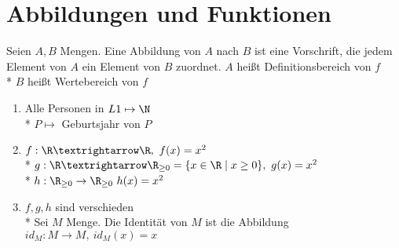 %
\chapter{Abbildungen und Funktionen}
Seien $A, B$ Mengen. Eine Abbildung von $A$ nach $B$ ist eine Vorschrift, die jedem Element von $A$ ein Element von $B$ zuordnet.
$A$ heißt Definitionsbereich von $f$\\*
$B$ heißt Wertebereich von $f$
%
\bsp
\begin{enumerate}
\item {Alle Personen in $L1 \mapsto \N$\\*
$P \mapsto$ Geburtsjahr von $P$}
%
\item{$f:\R → \R, \ f(x)=x^2$\\*
$g:\R→\R_{\geq 0}=\{x\in\R\mid x\geq 0\}, \ g(x)=x^2$\\*
$h: \R_{\geq 0} \to \R_{\geq 0} \ h(x) = x^2$}
\bem 
\item{
$f,g,h$ sind verschieden\\*
Sei $M$ Menge. Die Identität von $M$ ist die Abbildung $id_{M}:M→M, \ id_M(x)=x$}
\end{enumerate}

